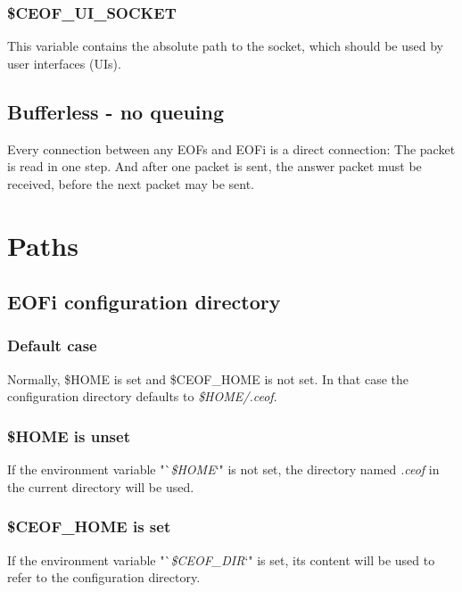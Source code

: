 \documentclass[12pt,a4paper]{book}
\begin{document}
\subsubsection{\$CEOF\_UI\_SOCKET}
This variable contains the absolute path to the socket, which should be used
by user interfaces (UIs).
\subsection{Bufferless - no queuing}
Every connection between any EOFs and EOFi is a direct connection:
The packet is read in one step. And after one packet is sent, the answer packet
must be received, before the next packet may be sent.
\section{Paths}
\subsection{EOFi configuration directory}
\subsubsection{Default case}
Normally, \$HOME is set and \$CEOF\_HOME is not set. In that case
the configuration directory defaults to \textit{\$HOME/.ceof}.
\subsubsection{\$HOME is unset}
If the environment variable "`\textit{\$HOME}`" is not set,
the directory named \textit{.ceof} in the current directory will be used.
\subsubsection{\$CEOF\_HOME is set}
If the environment variable "`\textit{\$CEOF\_DIR}`" is set,
its content will be used to refer to the configuration directory.
\end{document}
